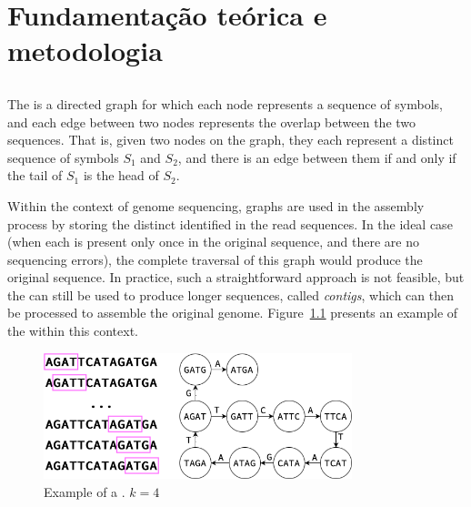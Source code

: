 \chapter{Fundamentação teórica e metodologia}

\section{\dBG}


The \dBG is a directed graph for which each node represents a sequence of symbols, and each edge between two nodes represents
the overlap between the two sequences. That is, given two nodes on the graph, they each represent a distinct sequence of symbols
$S_1$ and $S_2$, and there is an edge between them if and only if the tail of $S_1$ is the head of $S_2$.

Within the context of genome sequencing, \dB graphs are used in the assembly process by storing the distinct \kmers identified
in the read sequences. In the ideal case (when each \kmer is present only once in the original sequence, and there are no
sequencing errors), the complete traversal of this graph would produce the original sequence. In practice, such a straightforward
approach is not feasible, but the \dBG can still be used to produce longer sequences, called \emph{contigs}, which can then be processed
to assemble the original genome. Figure~\ref{fig:dbgexample} presents an example of the \dBG within this context.

\begin{figure}[htbp]
	\begin{center}
    \includegraphics[width=0.8\textwidth]{figures/dbg-example}
	\end{center}
	\caption{Example of a \dBG. $k=4$}\label{fig:dbgexample}
\end{figure}


